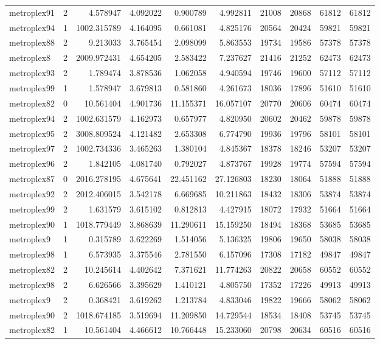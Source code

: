 \begin{longtable}{|l|r|r|r|r|r|r|r|r|r|}
metroplex91 & 2 & 4.578947 & 4.092022 & 0.900789 & 4.992811 & 21008 & 20868 & 61812 & 61812 \\
metroplex94 & 1 & 1002.315789 & 4.164095 & 0.661081 & 4.825176 & 20564 & 20424 & 59821 & 59821 \\
metroplex88 & 2 & 9.213033 & 3.765454 & 2.098099 & 5.863553 & 19734 & 19586 & 57378 & 57378 \\
metroplex8 & 2 & 2009.972431 & 4.654205 & 2.583422 & 7.237627 & 21416 & 21252 & 62473 & 62473 \\
metroplex93 & 2 & 1.789474 & 3.878536 & 1.062058 & 4.940594 & 19746 & 19600 & 57112 & 57112 \\
metroplex99 & 1 & 1.578947 & 3.679813 & 0.581860 & 4.261673 & 18036 & 17896 & 51610 & 51610 \\
metroplex82 & 0 & 10.561404 & 4.901736 & 11.155371 & 16.057107 & 20770 & 20606 & 60474 & 60474 \\
metroplex94 & 2 & 1002.631579 & 4.162973 & 0.657977 & 4.820950 & 20602 & 20462 & 59878 & 59878 \\
metroplex95 & 2 & 3008.809524 & 4.121482 & 2.653308 & 6.774790 & 19936 & 19796 & 58101 & 58101 \\
metroplex97 & 2 & 1002.734336 & 3.465263 & 1.380104 & 4.845367 & 18378 & 18246 & 53207 & 53207 \\
metroplex96 & 2 & 1.842105 & 4.081740 & 0.792027 & 4.873767 & 19928 & 19774 & 57594 & 57594 \\
metroplex87 & 0 & 2016.278195 & 4.675641 & 22.451162 & 27.126803 & 18230 & 18064 & 51888 & 51888 \\
metroplex92 & 2 & 2012.406015 & 3.542178 & 6.669685 & 10.211863 & 18432 & 18306 & 53874 & 53874 \\
metroplex99 & 2 & 1.631579 & 3.615102 & 0.812813 & 4.427915 & 18072 & 17932 & 51664 & 51664 \\
metroplex90 & 1 & 1018.779449 & 3.868639 & 11.290611 & 15.159250 & 18494 & 18368 & 53685 & 53685 \\
metroplex9 & 1 & 0.315789 & 3.622269 & 1.514056 & 5.136325 & 19806 & 19650 & 58038 & 58038 \\
metroplex98 & 1 & 6.573935 & 3.375546 & 2.781550 & 6.157096 & 17308 & 17182 & 49847 & 49847 \\
metroplex82 & 2 & 10.245614 & 4.402642 & 7.371621 & 11.774263 & 20822 & 20658 & 60552 & 60552 \\
metroplex98 & 2 & 6.626566 & 3.395629 & 1.410121 & 4.805750 & 17352 & 17226 & 49913 & 49913 \\
metroplex9 & 2 & 0.368421 & 3.619262 & 1.213784 & 4.833046 & 19822 & 19666 & 58062 & 58062 \\
metroplex90 & 2 & 1018.674185 & 3.519694 & 11.209850 & 14.729544 & 18534 & 18408 & 53745 & 53745 \\
metroplex82 & 1 & 10.561404 & 4.466612 & 10.766448 & 15.233060 & 20798 & 20634 & 60516 & 60516 \\
\end{longtable}
